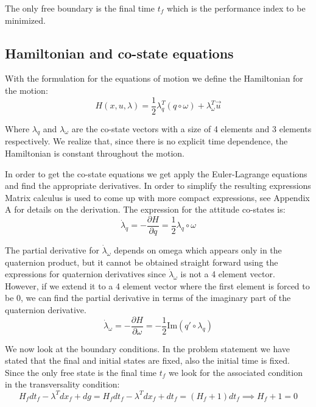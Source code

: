 The only free boundary is the final time $t_f$ which is the performance index to be minimized.

\subsection{Hamiltonian and co-state equations}
With the formulation for the equations of motion we define the Hamiltonian for the motion:
\begin{equation}
H(x,u,\lambda) = \frac{1}{2} \lambda_q^T (q \circ \omega) + \lambda_\omega^T \vec{u}
\end{equation}

Where $\lambda_q$ and $\lambda_\omega$ are the co-state vectors with a size of 4 elements and 3 elements respectively. We realize that, since there is no explicit time dependence, the Hamiltonian is constant throughout the motion. 

In order to get the co-state equations we get apply the Euler-Lagrange equations and find the appropriate derivatives. In order to simplify the resulting expressions Matrix calculus is used to come up with more compact expressions, see Appendix A for details on the derivation. The expression for the attitude co-states is:
\begin{equation}
\label{lambdaqDot}
\dot{\lambda}_q = - \frac{\partial H}{\partial q} =  \frac{1}{2} \lambda_q \circ \omega
\end{equation}

The partial derivative for $\dot{\lambda}_\omega$ depends on omega which appears only in the quaternion product, but it cannot be obtained straight forward using the expressions for quaternion derivatives since $\dot{\lambda}_\omega$ is not a 4 element vector. However, if we extend it to a 4 element vector where the first element is forced to be 0, we can find the partial derivative in terms of the imaginary part of the quaternion derivative.
\begin{equation}
\dot{\lambda}_\omega = - \frac{\partial H}{\partial \omega} = - \frac{1}{2} \text{Im}(q' \circ \lambda_q)
\end{equation}

We now look at the boundary conditions. In the problem statement we have stated that the final and initial states are fixed, also the initial time is fixed. Since the only free state is the final time $t_f$ we look for the associated condition in the transversality condition:
\begin{equation}
  H_f dt_f - \lambda^T dx_f + dg = H_f dt_f - \lambda^T dx_f + dt_f = (H_f + 1) dt_f \implies H_f + 1 = 0
\end{equation}

